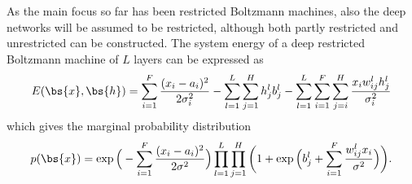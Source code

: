As the main focus so far has been restricted Boltzmann machines, also the deep networks will be assumed to be restricted, although both partly restricted and unrestricted can be constructed. The system energy of a deep restricted Boltzmann machine of $L$ layers can be expressed as
\begin{equation}
E(\bs{x},\bs{h})= \sum_{i=1}^F\frac{(x_i-a_i)^2}{2\sigma_i^2} - \sum_{l=1}^L\sum_{j=1}^Hh_j^lb_j^l-\sum_{l=1}^L\sum_{i=1}^F\sum_{j=i}^H \frac{x_iw_{ij}^lh_j^l}{\sigma_i^2}
\label{eq:deepgaussianbinary}
\end{equation}
which gives the marginal probability distribution
\begin{equation}
p(\bs{x})=\exp\Big(-\sum_{i=1}^F\frac{(x_i-a_i)^2}{2\sigma^2}\Big)\prod_{l=1}^L\prod_{j=1}^H\bigg(1+\exp\Big(b_j^l+\sum_{i=1}^F\frac{w_{ij}^lx_i}{\sigma^2}\Big)\bigg).
\label{eq:DNQSWF}
\end{equation}